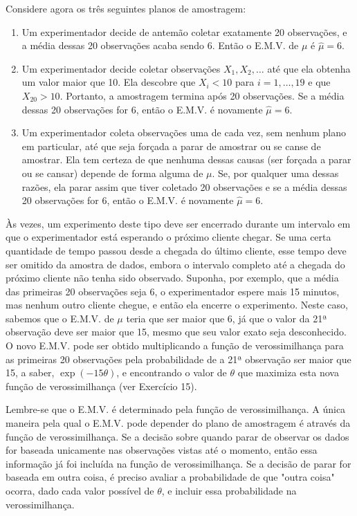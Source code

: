 Considere agora os três seguintes planos de amostragem:
\begin{enumerate}
    \item Um experimentador decide de antemão coletar exatamente 20 observações, e a média dessas 20 observações acaba sendo 6. Então o E.M.V. de $\mu$ é $\hat{\mu}=6$.
    \item Um experimentador decide coletar observações $X_1, X_2, \dots$ até que ela obtenha um valor maior que 10. Ela descobre que $X_i < 10$ para $i=1, \dots, 19$ e que $X_{20} > 10$. Portanto, a amostragem termina após 20 observações. Se a média dessas 20 observações for 6, então o E.M.V. é novamente $\hat{\mu}=6$.
    \item Um experimentador coleta observações uma de cada vez, sem nenhum plano em particular, até que seja forçada a parar de amostrar ou se canse de amostrar. Ela tem certeza de que nenhuma dessas causas (ser forçada a parar ou se cansar) depende de forma alguma de $\mu$. Se, por qualquer uma dessas razões, ela parar assim que tiver coletado 20 observações e se a média dessas 20 observações for 6, então o E.M.V. é novamente $\hat{\mu}=6$.
\end{enumerate}

Às vezes, um experimento deste tipo deve ser encerrado durante um intervalo em que o experimentador está esperando o próximo cliente chegar. Se uma certa quantidade de tempo passou desde a chegada do último cliente, esse tempo deve ser omitido da amostra de dados, embora o intervalo completo até a chegada do próximo cliente não tenha sido observado. Suponha, por exemplo, que a média das primeiras 20 observações seja 6, o experimentador espere mais 15 minutos, mas nenhum outro cliente chegue, e então ela encerre o experimento. Neste caso, sabemos que o E.M.V. de $\mu$ teria que ser maior que 6, já que o valor da 21ª observação deve ser maior que 15, mesmo que seu valor exato seja desconhecido. O novo E.M.V. pode ser obtido multiplicando a função de verossimilhança para as primeiras 20 observações pela probabilidade de a 21ª observação ser maior que 15, a saber, $\exp(-15\theta)$, e encontrando o valor de $\theta$ que maximiza esta nova função de verossimilhança (ver Exercício 15).

Lembre-se que o E.M.V. é determinado pela função de verossimilhança. A única maneira pela qual o E.M.V. pode depender do plano de amostragem é através da função de verossimilhança. Se a decisão sobre quando parar de observar os dados for baseada unicamente nas observações vistas até o momento, então essa informação já foi incluída na função de verossimilhança. Se a decisão de parar for baseada em outra coisa, é preciso avaliar a probabilidade de que "outra coisa" ocorra, dado cada valor possível de $\theta$, e incluir essa probabilidade na verossimilhança.

